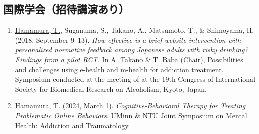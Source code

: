 \documentclass[11pt,a4paper]{article}
\begin{document}
\subsection{国際学会（招待講演あり）}
\begin{enumerate}
	\item \underline{Hamamura, T.}, Suganuma, S., Takano, A., Matsumoto, T., \& Shimoyama, H. (2018, September 9--13). \textit{How effective is a brief website intervention with personalized normative feedback among Japanese adults with risky drinking? Findings from a pilot RCT.} In A. Takano \& T. Baba (Chair), Possibilities and challenges using e-health and m-health for addiction treatment. Symposium conducted at the meeting of at the 19th Congress of International Society for Biomedical Research on Alcoholism, Kyoto, Japan.
	\item \underline{Hamamura, T.} (2024, March 1). \textit{Cognitive-Behavioral Therapy for Treating Problematic Online Behaviors}. UMinn \& NTU Joint Symposium on Mental Health: Addiction and Traumatology.
\end{enumerate}
\end{document}
